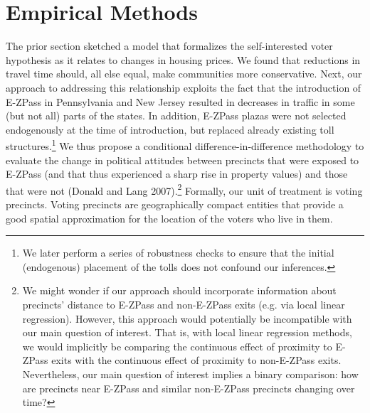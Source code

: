 \documentclass[11.0pt]{article}
\theoremstyle{definition}
\begin{document}
\section{Empirical Methods}
The prior section sketched a model that formalizes the self-interested voter hypothesis as it relates to changes in housing prices. We found that reductions in travel time should, all else equal, make communities more conservative. Next, our approach to addressing this relationship exploits the fact that the introduction of E-ZPass in Pennsylvania and New Jersey resulted in decreases in traffic in some (but not all) parts of the states. In addition, E-ZPass plazas were not selected endogenously at the time of introduction, but replaced already existing toll structures.\footnote{We later perform a series of robustness checks to ensure that the initial (endogenous) placement of the tolls does not confound our inferences.} We thus propose a conditional difference-in-difference methodology to evaluate the change in political attitudes between precincts that were exposed to E-ZPass (and that thus experienced a sharp rise in property values) and those that were not (Donald and Lang 2007).\footnote{We might wonder if our approach should incorporate information about precincts' distance to E-ZPass and non-E-ZPass exits (e.g. via local linear regression). However, this approach would potentially be incompatible with our main question of interest. That is, with local linear regression methods, we would implicitly be comparing the continuous effect of proximity to E-ZPass exits with the continuous effect of proximity to non-E-ZPass exits. Nevertheless, our main question of interest implies a binary comparison: how are precincts near E-ZPass and similar non-E-ZPass precincts changing over time? }  Formally, our unit of treatment is voting precincts. Voting precincts are geographically compact entities that provide a good spatial approximation for the location of the voters who live in them. 
\end{document}
